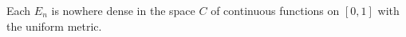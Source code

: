 Each $E_n$ is nowhere dense in the space $C$ of continuous functions on $[0,1]$ with the uniform metric.
